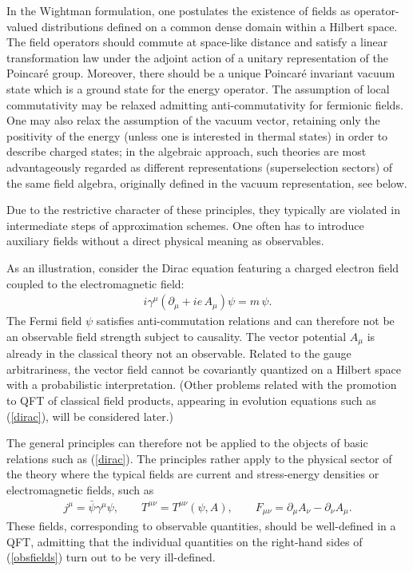 \documentclass[multphys,vecphys]{svmult}
\newcommand{\bea}{\begin{eqnarray}}
\newcommand{\eea}{\end{eqnarray}}
\begin{document}
In the Wightman formulation, one
postulates the existence of fields as operator-valued distributions
defined on a common dense domain within a Hilbert
space. The field operators should commute at space-like distance and
satisfy a linear transformation law under the adjoint action of a
unitary representation of the Poincar\'e group. Moreover, there should
be a unique Poincar\'e invariant vacuum state which is a
ground state for the energy operator. The
assumption of local commutativity may be relaxed
admitting anti-commutativity for fermionic fields. One may also relax
the assumption of the vacuum vector, retaining only the positivity of
the energy (unless one is interested in thermal
states) in order to describe charged states; in the
algebraic approach, such theories are most
advantageously regarded as different representations
(superselection sectors) of the same 
field algebra, originally defined in the vacuum representation, see below.
 
Due to the restrictive character of these principles, they typically
are violated in intermediate steps of approximation schemes. One often
has to introduce auxiliary fields without a direct physical meaning as
observables.  

As an illustration, consider the Dirac equation featuring a charged
electron field coupled to the electromagnetic field:
\bea 
\label{dirac}
  i\gamma^\mu(\partial_\mu+ie\, A_\mu)\psi = m\,\psi. 
\eea
The Fermi field $\psi$ satisfies anti-commutation relations and can
therefore not be an observable field strength subject to
causality. The vector potential $A_\mu$ is already in
the classical theory not an observable. Related to the gauge
arbitrariness, the vector field cannot be covariantly
quantized on a Hilbert space
with a probabilistic
interpretation. (Other problems related with the promotion to QFT of
classical field products, appearing in evolution equations such as
(\ref{dirac}), will be considered later.) 

The general principles can therefore not be applied to the objects
of basic relations such as (\ref{dirac}). The principles rather apply
to the physical sector of the theory where the typical fields are
current and stress-energy densities or electromagnetic fields, such as 
\bea 
\label{obsfields}
  j^\mu = \bar\psi\gamma^\mu\psi,\qquad T^{\mu\nu} =
  T^{\mu\nu}(\psi,A), \qquad F_{\mu\nu} = \partial_\mu A_\nu
  - \partial_\nu A_\mu. 
\eea
These fields, corresponding to observable quantities, should be
well-defined in a QFT, admitting that the individual quantities on the
right-hand sides of (\ref{obsfields}) turn out to be very ill-defined.
\end{document}
